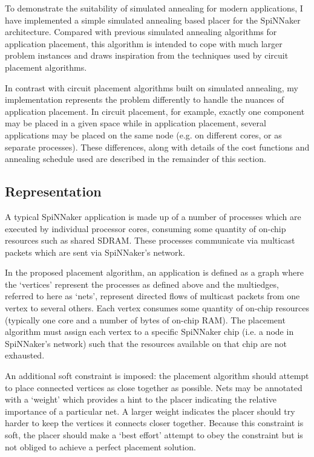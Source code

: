 		To demonstrate the suitability of simulated annealing for modern
		applications, I have implemented a simple simulated annealing based placer
		for the SpiNNaker architecture. Compared with previous simulated annealing
		algorithms for application placement, this algorithm is intended to cope
		with much larger problem instances and draws inspiration from the
		techniques used by circuit placement algorithms.
		
		In contrast with circuit placement algorithms built on simulated annealing,
		my implementation represents the problem differently to handle the nuances
		of application placement. In circuit placement, for example, exactly one
		component may be placed in a given space while in application placement,
		several applications may be placed on the same node (e.g. on different
		cores, or as separate processes). These differences, along with details of
		the cost functions and annealing schedule used are described in the
		remainder of this section.
		
		\subsection{Representation}
			
			A typical SpiNNaker application is made up of a number of processes which
			are executed by individual processor cores, consuming some quantity of
			on-chip resources such as shared SDRAM. These processes communicate via
			multicast packets which are sent via SpiNNaker's network.
			
			In the proposed placement algorithm, an application is defined as a graph
			where the `vertices' represent the processes as defined above and the
			multiedges, referred to here as `nets', represent directed flows of
			multicast packets from one vertex to several others. Each vertex consumes
			some quantity of on-chip resources (typically one core and a number of
			bytes of on-chip RAM). The placement algorithm must assign each vertex to
			a specific SpiNNaker chip (i.e. a node in SpiNNaker's network) such that
			the resources available on that chip are not exhausted.
			
			
			An additional soft constraint is imposed: the placement algorithm should
			attempt to place connected vertices as close together as possible. Nets
			may be annotated with a `weight' which provides a hint to the placer
			indicating the relative importance of a particular net. A larger weight
			indicates the placer should try harder to keep the vertices it connects
			closer together. Because this constraint is soft, the placer should make
			a `best effort' attempt to obey the constraint but is not obliged to
			achieve a perfect placement solution.
			
